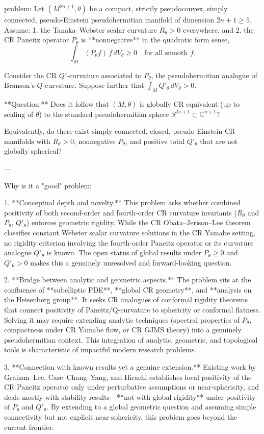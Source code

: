 problem:  
Let \((M^{2n+1}, \theta)\) be a compact, strictly pseudoconvex, simply connected, pseudo-Einstein pseudohermitian manifold of dimension \(2n+1 \ge 5\). Assume:  
1. the Tanaka–Webster scalar curvature \(R_\theta > 0\) everywhere, and  
2. the CR Paneitz operator \(P_\theta\) is **nonnegative** in the quadratic form sense,  
\[
\int_M (P_\theta f)\, f\, dV_\theta \ge 0 \quad \text{for all smooth } f.
\]  

Consider the CR \(Q'\)-curvature associated to \(P_\theta\), the pseudohermitian analogue of Branson’s \(Q\)-curvature. Suppose further that \(\int_M Q'_\theta\, dV_\theta > 0\).  

**Question:**  
Does it follow that \((M,\theta)\) is globally CR equivalent (up to scaling of \(\theta\)) to the standard pseudohermitian sphere \(S^{2n+1}\subset \mathbb{C}^{n+1}\)?  

Equivalently, do there exist simply connected, closed, pseudo-Einstein CR manifolds with \(R_\theta > 0\), nonnegative \(P_\theta\), and positive total \(Q'_\theta\) that are not globally spherical?  

---

Why is it a "good" problem:  

1. **Conceptual depth and novelty.**  
   This problem asks whether combined positivity of both second-order and fourth-order CR curvature invariants (\(R_\theta\) and \(P_\theta\), \(Q'_\theta\)) enforces geometric rigidity. While the CR Obata–Jerison–Lee theorem classifies constant Webster scalar curvature solutions in the CR Yamabe setting, no rigidity criterion involving the fourth-order Paneitz operator or its curvature analogue \(Q'_\theta\) is known. The open status of global results under \(P_\theta \ge 0\) and \(Q'_\theta > 0\) makes this a genuinely unresolved and forward-looking question.

2. **Bridge between analytic and geometric aspects.**  
   The problem sits at the confluence of **subelliptic PDE**, **global CR geometry**, and **analysis on the Heisenberg group**. It seeks CR analogues of conformal rigidity theorems that connect positivity of Paneitz/Q-curvature to sphericity or conformal flatness. Solving it may require extending analytic techniques (spectral properties of \(P_\theta\), compactness under CR Yamabe flow, or CR GJMS theory) into a genuinely pseudohermitian context. This integration of analytic, geometric, and topological tools is characteristic of impactful modern research problems.

3. **Connection with known results yet a genuine extension.**  
   Existing work by Graham–Lee, Case–Chang–Yang, and Hirachi establishes local positivity of the CR Paneitz operator only under perturbative assumptions or near-sphericity, and deals mostly with stability results—**not with global rigidity** under positivity of \(P_\theta\) and \(Q'_\theta\). By extending to a global geometric question and assuming simple connectivity but not explicit near-sphericity, this problem goes beyond the current frontier.

